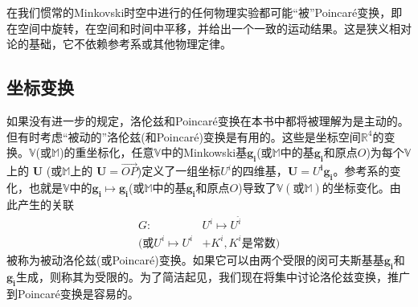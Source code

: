 \documentclass[utf8]{ctexbook}
\numberwithin{equation}{section}
\begin{document}
在我们惯常的Minkovski时空中进行的任何物理实验都可能“被”Poincaré变换，即在空间中旋转，在空间和时间中平移，并给出一个一致的运动结果。这是狭义相对论的基础，它不依赖参考系或其他物理定律。

\subsection*{坐标变换}
如果没有进一步的规定，洛伦兹和Poincaré变换在本书中都将被理解为是主动的。但有时考虑“被动的”洛伦兹(和Poincaré)变换是有用的。这些是坐标空间$\mathbb{R}^4$的变换。$\mathbb{V}$(或$\mathbb{M}$)的重坐标化，任意$\mathbb{V}$中的Minkowski基$\mathbf{g_i}$(或$\mathbb{M}$中的基$\mathbf{g_i}$和原点$O$)为每个$\mathbb{V}$上的 $\mathbf{U}$ (或$\mathbb{M}$上的 $\mathbf{U}=\overrightarrow{OP}$)定义了一组坐标$U^i$的四维基，$\mathbf{U}=U^\mathbf{i}\mathbf{g_i}$。参考系的变化，也就是$\mathbb{V}$中的$\mathbf{g_i}\mapsto \mathbf{g_{\hat{i}}}$(或$\mathbb{M}$中的基$\mathbf{g_i}$和原点$O$)导致了$\mathbb{V}( \text{或} \mathbb{M})$的坐标变化。由此产生的关联
\begin{align}
    G:&U^i\mapsto U^{\hat{i}}\label{eq:1123}\\
    (\text{或}U^i\mapsto U^i&+K^i, K^i \text{是常数}) \nonumber
\end{align}
被称为被动洛伦兹(或Poincaré)变换。如果它可以由两个受限的闵可夫斯基基$\mathbf{g_i}$和$\mathbf{g_{\hat{i}}}$生成，则称其为受限的。为了简洁起见，我们现在将集中讨论洛伦兹变换，推广到Poincaré变换是容易的。
\end{document}
